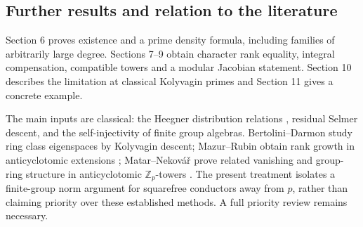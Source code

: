 \documentclass[11pt,a4paper]{article}
\numberwithin{equation}{section}
\begin{document}
\subsection{Further results and relation to the literature}
Section 6 proves existence and a prime density formula, including families of arbitrarily large degree. Sections 7--9 obtain character rank equality, integral compensation, compatible towers and a modular Jacobian statement. Section 10 describes the limitation at classical Kolyvagin primes and Section 11 gives a concrete example.

The main inputs are classical: the Heegner distribution relations \cite{BD}, residual Selmer descent, and the self-injectivity of finite group algebras. Bertolini--Darmon study ring class eigenspaces by Kolyvagin descent; Mazur--Rubin obtain rank growth in anticyclotomic extensions \cite{MRgrowth}; Matar--Nekov\'a\v{r} prove related vanishing and group-ring structure in anticyclotomic $\mathbb Z_p$-towers \cite{MN,MNcorr}. The present treatment isolates a finite-group norm argument for squarefree conductors away from $p$, rather than claiming priority over these established methods. A full priority review remains necessary.
\end{document}
